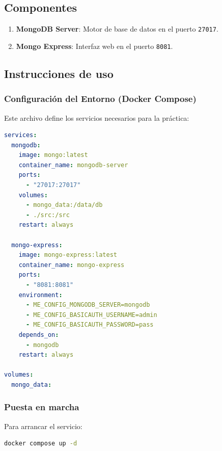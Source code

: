 \documentclass[12pt,a4paper]{article}
\providecommand{\tightlist}{%
  \setlength{\itemsep}{0pt}\setlength{\parskip}{0pt}}
\begin{document}
\subsection{Componentes}\label{componentes}

\begin{enumerate}
\def\labelenumi{\arabic{enumi}.}
\tightlist
\item
  \textbf{MongoDB Server}: Motor de base de datos en el puerto
  \texttt{27017}.
\item
  \textbf{Mongo Express}: Interfaz web en el puerto
  \texttt{8081}.
\end{enumerate}

\hypertarget{instrucciones-de-uso}{%
\subsection{Instrucciones de uso}\label{instrucciones-de-uso}}

\subsubsection{Configuración del Entorno (Docker Compose)}\label{configuracion-del-entorno}

Este archivo define los servicios necesarios para la práctica:

\begin{lstlisting}[language=YAML]
services:
  mongodb:
    image: mongo:latest
    container_name: mongodb-server
    ports:
      - "27017:27017"
    volumes:
      - mongo_data:/data/db
      - ./src:/src
    restart: always

  mongo-express:
    image: mongo-express:latest
    container_name: mongo-express
    ports:
      - "8081:8081"
    environment:
      - ME_CONFIG_MONGODB_SERVER=mongodb
      - ME_CONFIG_BASICAUTH_USERNAME=admin
      - ME_CONFIG_BASICAUTH_PASSWORD=pass
    depends_on:
      - mongodb
    restart: always

volumes:
  mongo_data:
\end{lstlisting}

\subsubsection{Puesta en marcha}\label{puesta-en-marcha}

Para arrancar el servicio:

\begin{lstlisting}[language=bash]
docker compose up -d
\end{lstlisting}
\end{document}
